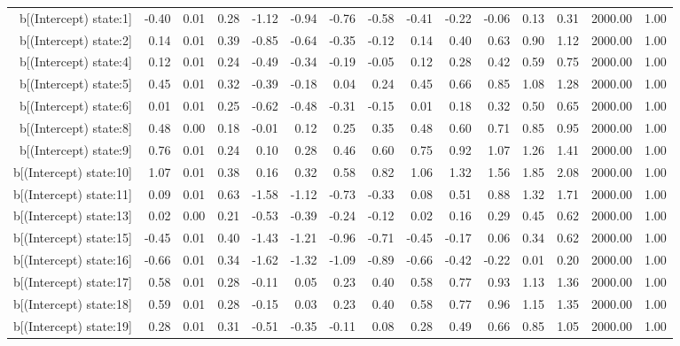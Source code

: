 \begin{table}[ht]
\begin{tabular}{rrrrrrrrrrrrrrr}
  b[(Intercept) state:1] & -0.40 & 0.01 & 0.28 & -1.12 & -0.94 & -0.76 & -0.58 & -0.41 & -0.22 & -0.06 & 0.13 & 0.31 & 2000.00 & 1.00 \\ 
  b[(Intercept) state:2] & 0.14 & 0.01 & 0.39 & -0.85 & -0.64 & -0.35 & -0.12 & 0.14 & 0.40 & 0.63 & 0.90 & 1.12 & 2000.00 & 1.00 \\ 
  b[(Intercept) state:4] & 0.12 & 0.01 & 0.24 & -0.49 & -0.34 & -0.19 & -0.05 & 0.12 & 0.28 & 0.42 & 0.59 & 0.75 & 2000.00 & 1.00 \\ 
  b[(Intercept) state:5] & 0.45 & 0.01 & 0.32 & -0.39 & -0.18 & 0.04 & 0.24 & 0.45 & 0.66 & 0.85 & 1.08 & 1.28 & 2000.00 & 1.00 \\ 
  b[(Intercept) state:6] & 0.01 & 0.01 & 0.25 & -0.62 & -0.48 & -0.31 & -0.15 & 0.01 & 0.18 & 0.32 & 0.50 & 0.65 & 2000.00 & 1.00 \\ 
  b[(Intercept) state:8] & 0.48 & 0.00 & 0.18 & -0.01 & 0.12 & 0.25 & 0.35 & 0.48 & 0.60 & 0.71 & 0.85 & 0.95 & 2000.00 & 1.00 \\ 
  b[(Intercept) state:9] & 0.76 & 0.01 & 0.24 & 0.10 & 0.28 & 0.46 & 0.60 & 0.75 & 0.92 & 1.07 & 1.26 & 1.41 & 2000.00 & 1.00 \\ 
  b[(Intercept) state:10] & 1.07 & 0.01 & 0.38 & 0.16 & 0.32 & 0.58 & 0.82 & 1.06 & 1.32 & 1.56 & 1.85 & 2.08 & 2000.00 & 1.00 \\ 
  b[(Intercept) state:11] & 0.09 & 0.01 & 0.63 & -1.58 & -1.12 & -0.73 & -0.33 & 0.08 & 0.51 & 0.88 & 1.32 & 1.71 & 2000.00 & 1.00 \\ 
  b[(Intercept) state:13] & 0.02 & 0.00 & 0.21 & -0.53 & -0.39 & -0.24 & -0.12 & 0.02 & 0.16 & 0.29 & 0.45 & 0.62 & 2000.00 & 1.00 \\ 
  b[(Intercept) state:15] & -0.45 & 0.01 & 0.40 & -1.43 & -1.21 & -0.96 & -0.71 & -0.45 & -0.17 & 0.06 & 0.34 & 0.62 & 2000.00 & 1.00 \\ 
  b[(Intercept) state:16] & -0.66 & 0.01 & 0.34 & -1.62 & -1.32 & -1.09 & -0.89 & -0.66 & -0.42 & -0.22 & 0.01 & 0.20 & 2000.00 & 1.00 \\ 
  b[(Intercept) state:17] & 0.58 & 0.01 & 0.28 & -0.11 & 0.05 & 0.23 & 0.40 & 0.58 & 0.77 & 0.93 & 1.13 & 1.36 & 2000.00 & 1.00 \\ 
  b[(Intercept) state:18] & 0.59 & 0.01 & 0.28 & -0.15 & 0.03 & 0.23 & 0.40 & 0.58 & 0.77 & 0.96 & 1.15 & 1.35 & 2000.00 & 1.00 \\ 
  b[(Intercept) state:19] & 0.28 & 0.01 & 0.31 & -0.51 & -0.35 & -0.11 & 0.08 & 0.28 & 0.49 & 0.66 & 0.85 & 1.05 & 2000.00 & 1.00 \\ 

\end{tabular}
\end{table}
